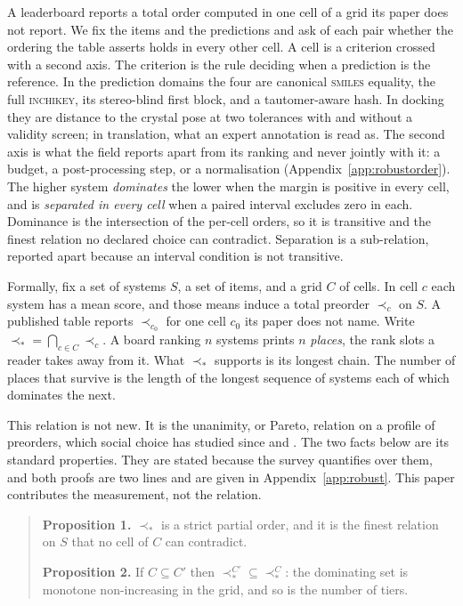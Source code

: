 \documentclass{article}
\begin{document}
A leaderboard reports a total order computed in one cell of a grid its paper does not report. We fix
the items and the predictions and ask of each pair whether the ordering the table asserts holds in
every other cell. A cell is a criterion crossed with a second axis. The criterion is the rule
deciding when a prediction is the reference. In the prediction domains the four are canonical
\textsc{smiles} equality, the full \textsc{inchikey}, its stereo-blind first block, and a
tautomer-aware hash. In docking they are distance to the crystal pose at two tolerances with and
without a validity screen; in translation, what an expert annotation is read as. The second axis is
what the field reports apart from its ranking and never jointly with it: a budget, a post-processing
step, or a normalisation (Appendix~\ref{app:robustorder}). The higher system \emph{dominates} the
lower when the margin is positive in every cell, and is \emph{separated in every cell} when a paired
interval excludes zero in each. Dominance is the intersection of the per-cell orders, so it is
transitive and the finest relation no declared choice can contradict. Separation is a
sub-relation, reported apart because an interval condition is not transitive.

Formally, fix a set of systems $S$, a set of items, and a grid $C$ of cells. In cell $c$ each system
has a mean score, and those means induce a total preorder $\prec_c$ on $S$. A published table
reports $\prec_{c_0}$ for one cell $c_0$ its paper does not name. Write $\prec_{\!*} = \bigcap_{c \in C} \prec_c$.
A board ranking $n$ systems prints $n$ \emph{places}, the rank slots a reader takes away
from it. What $\prec_{\!*}$ supports is its longest chain. The number of places that survive is the
length of the longest sequence of systems each of which dominates the next.

This relation is not new. It is the unanimity, or Pareto, relation on a profile of preorders, which
social choice has studied since \citet{Arrow_1951} and \citet{Sen_1970}. The two facts below are its
standard properties. They are stated because the survey quantifies over them, and both
proofs are two lines and are given in Appendix~\ref{app:robust}. This paper contributes the
measurement, not the relation.

\begin{quote}
\textbf{Proposition 1.} $\prec_{\!*}$ is a strict partial order, and it is the finest relation on
$S$ that no cell of $C$ can contradict.

\textbf{Proposition 2.} If $C \subseteq C'$ then $\prec_{\!*}^{C'} \subseteq \prec_{\!*}^{C}$: the
dominating set is monotone non-increasing in the grid, and so is the number of tiers.
\end{quote}
\end{document}
